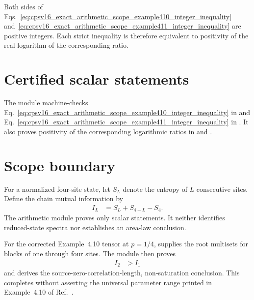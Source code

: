\documentclass{article}
\begin{document}
Both sides of
Eqs.~\ref{eq:cpsv16_exact_arithmetic_scope_example410_integer_inequality}
and~\ref{eq:cpsv16_exact_arithmetic_scope_example411_integer_inequality} are
positive integers. Each strict inequality is therefore equivalent to
positivity of the real logarithm of the corresponding ratio.

\section{Certified scalar statements}

The module
 machine-checks
Eq.~\ref{eq:cpsv16_exact_arithmetic_scope_example410_integer_inequality} in
 and
Eq.~\ref{eq:cpsv16_exact_arithmetic_scope_example411_integer_inequality} in
. It also
proves positivity of the corresponding logarithmic ratios in
 and
.

\section{Scope boundary}

For a normalized four-site state, let $S_L$ denote the entropy of $L$
consecutive sites. Define the chain mutual information by
\begin{align}
    I_L
        &= S_L+S_{4-L}-S_4.
    \label{eq:cpsv16_exact_arithmetic_scope_mutual_information}
\end{align}
The arithmetic module proves only scalar statements. It neither identifies
reduced-state spectra nor establishes an area-law conclusion.

For the corrected Example~4.10 tensor at $p=1/4$,
 supplies the root multisets
for blocks of one through four sites. The module
 then proves
\begin{align}
    I_2
        &> I_1
    \label{eq:cpsv16_exact_arithmetic_scope_example410_mutual_information_defect}
\end{align}
and derives the source-zero-correlation-length, non-saturation conclusion. This
completes  without asserting the universal parameter range
printed in Example~4.10 of Ref.~\cite{Cirac2016MPDO_arXiv}.
\end{document}
